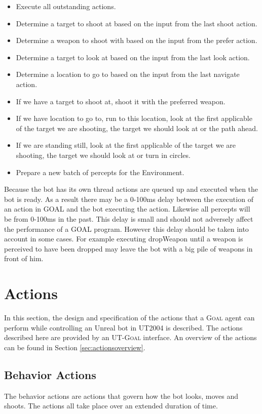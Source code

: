 \documentclass[11pt,a4paper]{article}
\newcommand{\Goal}{\textsc{Goal}}
\begin{document}
\begin{itemize}
	\item Execute all outstanding actions.
	\item Determine a target to shoot at based on the input from the last shoot action.
	\item Determine a weapon to shoot with based on the input from the prefer action.
	\item Determine a target to look at based on the input from the last look action.
	\item Determine a location to go to based on the input from the last navigate action.
	\item If we have a target to shoot at,  shoot it with the preferred weapon.
	\item If we have location to go to, run to this location, look at the first applicable of the target we are shooting, the target we should look at or the path ahead.
 	\item If we are standing still, look at the first applicable of the target we are shooting, the target we should look at or turn in circles.
	\item Prepare a new batch of percepts for the Environment.
\end{itemize}


Because the bot has its own thread actions are queued up and executed when the bot is ready. As a result there may be a 0-100ms delay between the execution of an action in GOAL and the bot executing the action. Likewise all percepts will be from 0-100ms in the past. This delay is small and should not adversely affect the performance of a GOAL program. However this delay should be taken into account in some cases. For example executing dropWeapon until a weapon is perceived to have been dropped may leave the bot with a big pile of weapons in front of him.

\section{Actions}
\label{sec:actions}
In this section, the design and specification of the actions that a {\Goal} agent can perform while controlling an Unreal bot in UT2004 is described. The actions described here are provided by an UT-{\Goal} interface. An overview of the actions can be found in Section \ref{sec:actionsoverview}.

\subsection{Behavior Actions}
The behavior actions are actions that govern how the bot looks, moves and shoots. The actions all take place over an extended duration of time.
\end{document}

